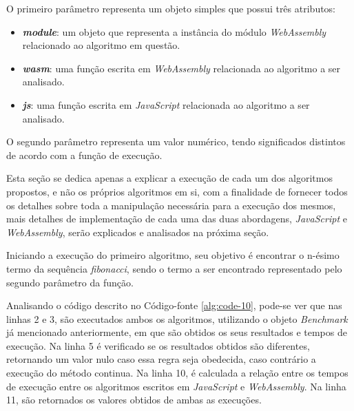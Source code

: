 O primeiro parâmetro representa um objeto simples que possui três atributos:

\begin{itemize}
    \item \textit{\textbf{module}}: um objeto que representa a instância do módulo
    \textit{WebAssembly} relacionado ao algoritmo em questão.
    \item \textit{\textbf{wasm}}: uma função escrita em \textit{WebAssembly} relacionada
    ao algoritmo a ser analisado.
    \item \textit{\textbf{js}}: uma função escrita em \textit{JavaScript} relacionada ao
    algoritmo a ser analisado.
\end{itemize}

O segundo parâmetro representa um valor numérico, tendo significados distintos de acordo
com a função de execução.

Esta seção se dedica apenas a explicar a execução de cada um dos algoritmos propostos, e
não os próprios algoritmos em si, com a finalidade de fornecer todos os detalhes sobre
toda a manipulação necessária para a execução dos mesmos, mais detalhes de implementação
de cada uma das duas abordagens, \textit{JavaScript} e \textit{WebAssembly}, serão
explicados e analisados na próxima seção.



Iniciando a execução do primeiro algoritmo, seu objetivo é encontrar o n-ésimo termo da
sequência \textit{fibonacci}, sendo o termo a ser encontrado representado pelo segundo
parâmetro da função.

Analisando o código descrito no Código-fonte \ref{alg:code-10}, pode-se ver que nas
linhas 2 e 3, são executados ambos os algoritmos, utilizando o objeto \textit{Benchmark}
já mencionado anteriormente, em que são obtidos os seus resultados e tempos de execução.
Na linha 5 é verificado se os resultados obtidos são diferentes, retornando um valor nulo
caso essa regra seja obedecida, caso contrário a execução do método continua. Na linha 10,
é calculada a relação entre os tempos de execução entre os algoritmos escritos em
\textit{JavaScript} e \textit{WebAssembly}. Na linha 11, são retornados os valores obtidos
de ambas as execuções.



